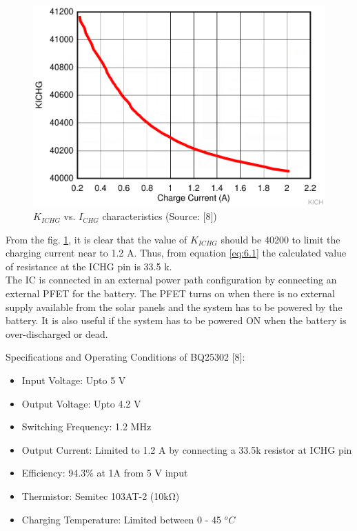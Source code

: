   \begin{center}
 	\begin{figure}[h]
 		\centering
 		\includegraphics[width=0.7\columnwidth]{kich.png}
 		\caption[$K_{ICHG}$ vs. $I_{CHG}$ characteristics]{\centering $K_{ICHG}$ vs. $I_{CHG}$ characteristics (Source: [8])}
 		\label{fig:kichg}
 	\end{figure}
 \end{center}
 From the fig. \ref{fig:kichg}, it is clear that the value of $K_{ICHG}$ should be 40200 to limit the charging current near to 1.2 A. Thus, from equation \ref{eq:6.1} the calculated value of resistance at the ICHG pin is 33.5 k\ohm.
 \\
 
 The IC is connected in an external power path configuration by connecting an external PFET for the battery. The PFET turns on when there is no external supply available from the solar panels and the system has to be powered by the battery. It is also useful if the system has to be powered ON when the battery is over-discharged or dead. 
 
 
 Specifications and Operating Conditions of BQ25302 [8]:
\begin{itemize}
 	\item Input Voltage: Upto 5 V
 	\item Output Voltage: Upto 4.2 V
 	\item Switching Frequency: 1.2 MHz
 	\item Output Current: Limited to 1.2 A by connecting a 33.5k resistor at ICHG pin 
 	\item Efficiency: 94.3\% at 1A from 5 V input 
 	\item Thermistor: Semitec 103AT-2 (10\si{\kilo\ohm})
 	\item Charging Temperature: Limited between 0 - 45 $^{o}C$
 \end{itemize}

